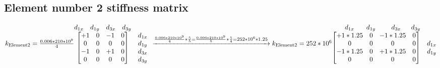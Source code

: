 \documentclass{article}
\begin{document}
\subsection{Element number 2 stiffness matrix}
    \begin{math}
    k_{\text{Element2}}=\frac{0.006*210*10^9}{4}
        \begin{matrix}
            \begin{matrix}
            d_{1x}&d_{1y}&d_{3x}&d_{3y}\\
            \end {matrix}\\
            \begin{bmatrix}
            +1&0&-1&0\\
            0&0& 0&0\\
            -1&0&+1&0\\
            0&0& 0&0\\
            \end{bmatrix}&
            \begin{matrix}
            d_{1x}\\
            d_{1y}\\
            d_{3x}\\
            d_{3y}\\
            \end{matrix}
        \end{matrix}
        \newline
        \xrightarrow{\frac{0.006*210*10^9}{4}*\frac{5}{5}=\frac{0.006*210*10^9}{5}*\frac{5}{4}=252*10^6*1.25}k_{\text{Element2}}= 252*10^6
        \begin{matrix}
            \begin{matrix}
            \;\;\;\;\;\;\;d_{1x}&\;\;\;d_{1y}&\;\;\;\;\;d_{3x}&\;\;d_{3y}\\
            \end{matrix}\\
            \begin{bmatrix}
            +1*1.25&0&-1*1.25&0\\
            0      &0&0      &0\\
            -1*1.25&0&+1*1.25&0\\
            0      &0&0      &0\\
            \end{bmatrix}&
            \begin{matrix}
            d_{1x}\\
            d_{1y}\\

\end{matrix}
\end{matrix}
\end{math}
\end{document}
